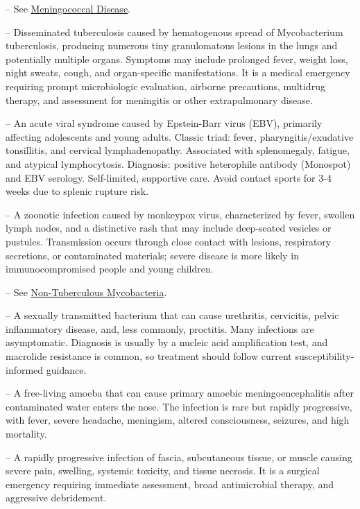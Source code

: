 -- See \hyperlink{Meningococcal Disease}{Meningococcal Disease}.

-- Disseminated tuberculosis caused by hematogenous spread of Mycobacterium tuberculosis, producing numerous tiny granulomatous lesions in the lungs and potentially multiple organs. Symptoms may include prolonged fever, weight loss, night sweats, cough, and organ-specific manifestations. It is a medical emergency requiring prompt microbiologic evaluation, airborne precautions, multidrug therapy, and assessment for meningitis or other extrapulmonary disease.

-- An acute viral syndrome caused by Epstein-Barr virus (EBV), primarily affecting adolescents and young adults. Classic triad: fever, pharyngitis/exudative tonsillitis, and cervical lymphadenopathy. Associated with splenomegaly, fatigue, and atypical lymphocytosis. Diagnosis: positive heterophile antibody (Monospot) and EBV serology. Self-limited, supportive care. Avoid contact sports for 3-4 weeks due to splenic rupture risk.

-- A zoonotic infection caused by monkeypox virus, characterized by fever, swollen lymph nodes, and a distinctive rash that may include deep-seated vesicles or pustules. Transmission occurs through close contact with lesions, respiratory secretions, or contaminated materials; severe disease is more likely in immunocompromised people and young children.

-- See \hyperlink{Non-Tuberculous Mycobacteria}{Non-Tuberculous Mycobacteria}.

-- A sexually transmitted bacterium that can cause urethritis, cervicitis, pelvic inflammatory disease, and, less commonly, proctitis. Many infections are asymptomatic. Diagnosis is usually by a nucleic acid amplification test, and macrolide resistance is common, so treatment should follow current susceptibility-informed guidance.

-- A free-living amoeba that can cause primary amoebic meningoencephalitis after contaminated water enters the nose. The infection is rare but rapidly progressive, with fever, severe headache, meningism, altered consciousness, seizures, and high mortality.

-- A rapidly progressive infection of fascia, subcutaneous tissue, or muscle causing severe pain, swelling, systemic toxicity, and tissue necrosis. It is a surgical emergency requiring immediate assessment, broad antimicrobial therapy, and aggressive debridement.

